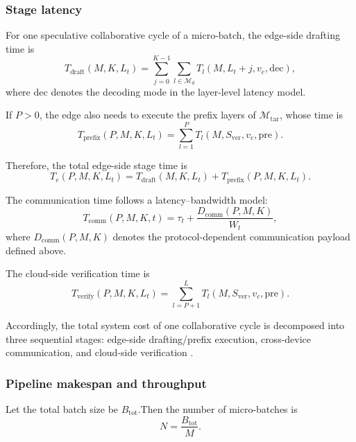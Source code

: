 \documentclass[a4paper,fleqn]{cas-dc}
\begin{document}
\subsubsection{Stage latency}

For one speculative collaborative cycle of a micro-batch, the edge-side drafting time is
\begin{equation}
T_{\mathrm{draft}}(M,K,L_t) = \sum_{j=0}^{K-1} \sum_{l \in \mathcal{M}_d} T_l(M,L_t+j,v_e,\mathrm{dec}),
\end{equation}
where $\mathrm{dec}$ denotes the decoding mode in the layer-level latency model.

If $P > 0$, the edge also needs to execute the prefix layers of $\mathcal{M}_{\mathrm{tar}}$, whose time is
\begin{equation}
T_{\mathrm{prefix}}(P,M,K,L_t) = \sum_{l=1}^{P} T_l(M,S_{\mathrm{ver}},v_e,\mathrm{pre}).
\end{equation}

Therefore, the total edge-side stage time is
\begin{equation}
T_e(P,M,K,L_t) = T_{\mathrm{draft}}(M,K,L_t) + T_{\mathrm{prefix}}(P,M,K,L_t).
\end{equation}

The communication time follows a latency--bandwidth model:
\begin{equation}
T_{\mathrm{comm}}(P,M,K,t) = \tau_t + \frac{D_{\mathrm{comm}}(P,M,K)}{W_t},
\end{equation}
where $D_{\mathrm{comm}}(P,M,K)$ denotes the protocol-dependent communication payload defined above.


The cloud-side verification time is
\begin{equation}
T_{\mathrm{verify}}(P,M,K,L_t) = \sum_{l=P+1}^{L} T_l(M,S_{\mathrm{ver}},v_c,\mathrm{pre}).
\end{equation}

Accordingly, the total system cost of one collaborative cycle is decomposed into three sequential stages: edge-side drafting/prefix execution, cross-device communication, and cloud-side verification \cite{zhong2024distserve}.

\subsubsection{Pipeline makespan and throughput}

Let the total batch size be $B_{\mathrm{tot}}$.Then the number of micro-batches is
\begin{equation}
N = \frac{B_{\mathrm{tot}}}{M}.
\end{equation}
\end{document}

